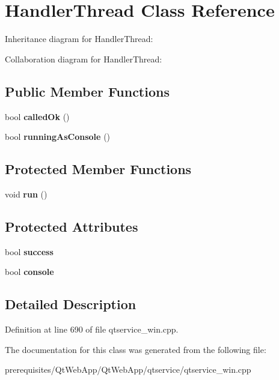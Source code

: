 \hypertarget{class_handler_thread}{}\section{Handler\+Thread Class Reference}
\label{class_handler_thread}


Inheritance diagram for Handler\+Thread\+:


Collaboration diagram for Handler\+Thread\+:
\subsection*{Public Member Functions}
\begin{DoxyCompactItemize}
\item 
\mbox{\label{class_handler_thread_a2425fd3ef03366b018c39cf6e1197383}} 
bool {\bfseries called\+Ok} ()
\item 
\mbox{\label{class_handler_thread_af6b14aa00f655a01d9d7f9f37e755a01}} 
bool {\bfseries running\+As\+Console} ()
\end{DoxyCompactItemize}
\subsection*{Protected Member Functions}
\begin{DoxyCompactItemize}
\item 
\mbox{\label{class_handler_thread_a1b8072811a6f79a18f332054d05d4a0d}} 
void {\bfseries run} ()
\end{DoxyCompactItemize}
\subsection*{Protected Attributes}
\begin{DoxyCompactItemize}
\item 
\mbox{\label{class_handler_thread_ae939de0dcd9efdfbdda0bc8a67320241}} 
bool {\bfseries success}
\item 
\mbox{\label{class_handler_thread_a094154c070cd65f1cf971d022b6966eb}} 
bool {\bfseries console}
\end{DoxyCompactItemize}


\subsection{Detailed Description}


Definition at line 690 of file qtservice\+\_\+win.\+cpp.



The documentation for this class was generated from the following file\+:\begin{DoxyCompactItemize}
\item 
prerequisites/\+Qt\+Web\+App/\+Qt\+Web\+App/qtservice/qtservice\+\_\+win.\+cpp\end{DoxyCompactItemize}
